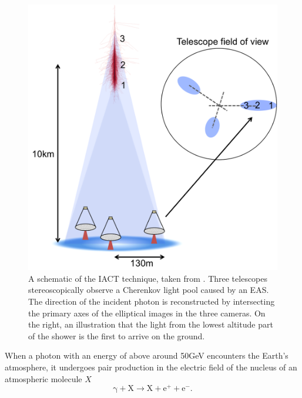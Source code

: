 \begin{figure}[ht] 
        \centering \includegraphics[width=0.7\columnwidth]{figures/schematic.png}

        \caption{
                \label{fig:schem} %
                A schematic of the IACT technique, taken from \cite{jamieiact}. Three telescopes stereoscopically observe a
                Cherenkov light pool caused by an EAS. The direction of the incident photon is reconstructed by intersecting the primary axes of 				 the elliptical images in the three cameras. On the right, an illustration that the light from the lowest altitude part of the shower is the first to arrive on the ground.
        }
\end{figure}
When a photon with an energy of above around 50GeV encounters the Earth's atmosphere, it undergoes pair production in the electric field of the nucleus of an atmospheric molecule $X$
\begin{equation}
\mathrm{\gamma}+\mathrm{X} \rightarrow \mathrm{X}+\mathrm{e^+}+ \mathrm{e^-}.
\end{equation}
